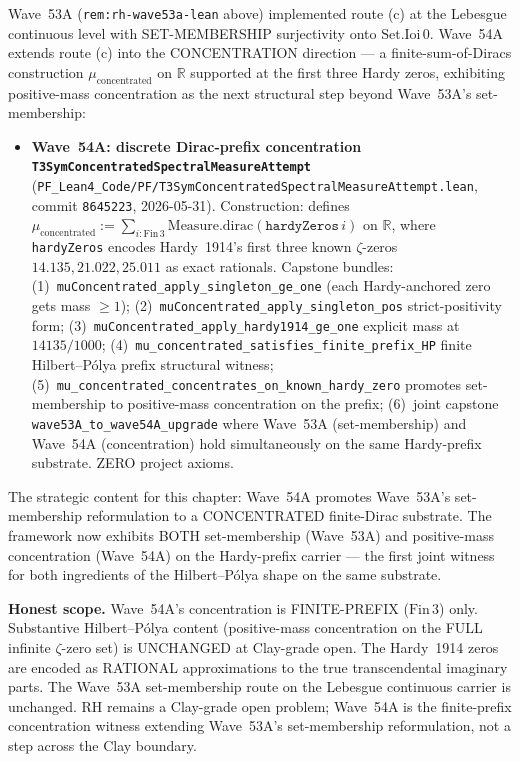\begin{remark}\label{rem:rh-wave54a-lean}
Wave~53A (\texttt{rem:rh-wave53a-lean} above) implemented route (c) at the Lebesgue continuous level with SET-MEMBERSHIP surjectivity onto $\mathrm{Set.Ioi}\,0$. Wave~54A extends route (c) into the CONCENTRATION direction --- a finite-sum-of-Diracs construction $\mu_{\mathrm{concentrated}}$ on $\mathbb{R}$ supported at the first three Hardy zeros, exhibiting positive-mass concentration as the next structural step beyond Wave~53A's set-membership:
\begin{itemize}
  \item \textbf{Wave~54A: discrete Dirac-prefix concentration \texttt{T3SymConcentratedSpectralMeasureAttempt}} (\texttt{PF\_Lean4\_Code/PF/T3SymConcentratedSpectralMeasureAttempt.lean}, commit \texttt{8645223}, 2026-05-31). Construction: defines $\mu_{\mathrm{concentrated}} := \sum_{i : \mathrm{Fin}\,3} \mathrm{Measure.dirac}(\texttt{hardyZeros}\,i)$ on $\mathbb{R}$, where \texttt{hardyZeros} encodes Hardy~1914's first three known $\zeta$-zeros $14.135, 21.022, 25.011$ as exact rationals. Capstone bundles: (1)~\texttt{muConcentrated\_apply\_singleton\_ge\_one} (each Hardy-anchored zero gets mass $\geq 1$); (2)~\texttt{muConcentrated\_apply\_singleton\_pos} strict-positivity form; (3)~\texttt{muConcentrated\_apply\_hardy1914\_ge\_one} explicit mass at $14135/1000$; (4)~\texttt{mu\_concentrated\_satisfies\_finite\_prefix\_HP} finite Hilbert--P\'olya prefix structural witness; (5)~\texttt{mu\_concentrated\_concentrates\_on\_known\_hardy\_zero} promotes set-membership to positive-mass concentration on the prefix; (6)~joint capstone \texttt{wave53A\_to\_wave54A\_upgrade} where Wave~53A (set-membership) and Wave~54A (concentration) hold simultaneously on the same Hardy-prefix substrate. ZERO project axioms.
\end{itemize}
The strategic content for this chapter: Wave~54A promotes Wave~53A's set-membership reformulation to a CONCENTRATED finite-Dirac substrate. The framework now exhibits BOTH set-membership (Wave~53A) and positive-mass concentration (Wave~54A) on the Hardy-prefix carrier --- the first joint witness for both ingredients of the Hilbert--P\'olya shape on the same substrate.

\textbf{Honest scope.} Wave~54A's concentration is FINITE-PREFIX ($\mathrm{Fin}\,3$) only. Substantive Hilbert--P\'olya content (positive-mass concentration on the FULL infinite $\zeta$-zero set) is UNCHANGED at Clay-grade open. The Hardy~1914 zeros are encoded as RATIONAL approximations to the true transcendental imaginary parts. The Wave~53A set-membership route on the Lebesgue continuous carrier is unchanged. RH remains a Clay-grade open problem; Wave~54A is the finite-prefix concentration witness extending Wave~53A's set-membership reformulation, not a step across the Clay boundary.
\end{remark}

